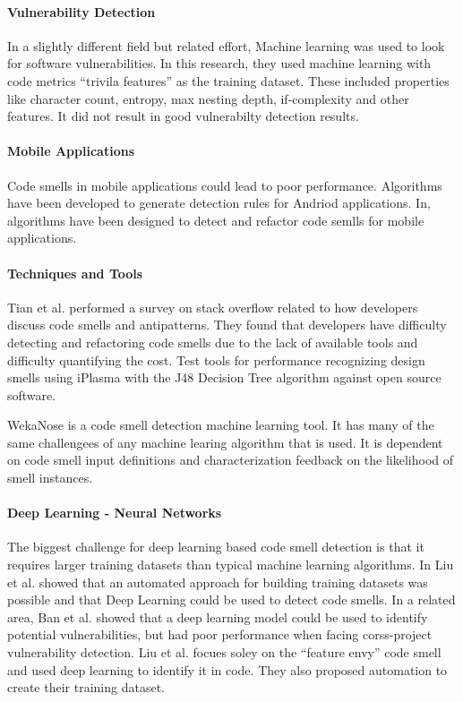 \documentclass[conference]{IEEEtran}
\begin{document}
\paragraph{Vulnerability Detection}
In a slightly different field but related effort, Machine learning was used to look for software vulnerabilities\cite{chernis_machine_2018}. In this research, they used machine learning with code metrics ``trivila features'' as the training dataset. These included properties like character count, entropy, max nesting depth, if-complexity and other features. It did not result in good vulnerabilty detection results.

\paragraph{Mobile Applications}
Code smells in mobile applications could lead to poor performance. Algorithms have been developed\cite{rubin_sniffing_2019}\cite{ibrahim_reducing_2018} to generate detection rules for Andriod applications. In\cite{ibrahim_reducing_2018}, algorithms have been designed to detect and refactor code semlls for mobile applications.

\paragraph{Techniques and Tools}
Tian et al.\cite{tian_how_2019} performed a survey on stack overflow related to how developers discuss code smells and antipatterns. 
They found that developers have difficulty detecting and refactoring code smells due to the lack of available tools and difficulty quantifying the cost.
Test tools for performance recognizing design smells using iPlasma with the J48 Decision Tree algorithm\cite{singh_systematic_2018} against open source software.

WekaNose is a code smell detection machine learning tool\cite{azadi_poster:_2018}. It has many of the same challengees of any machine learing algorithm that is used. It is dependent on code smell input definitions and characterization feedback on the likelihood of smell instances. 

\paragraph{Deep Learning - Neural Networks} The biggest challenge for deep learning based code smell detection\cite{liu_deep_2019} is that it requires larger training datasets than typical machine learning algorithms. In \cite{liu_deep_2019} Liu et al. showed that an automated approach for building training datasets was possible and that Deep Learning could be used to detect code smells.
In a related area, Ban et al. showed that a deep learning model could be used to identify potential vulnerabilities\cite{ban_performance_2019}, but had poor performance when facing corss-project vulnerability detection.
Liu et al. focues soley on the ``feature envy'' code smell and used deep learning to identify it in code. They also proposed automation to create their training dataset.
\end{document}
